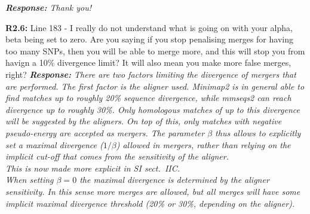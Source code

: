 \documentclass[aps,rmp,onecolumn]{revtex4-1}
\newcommand{\reviewer}[2]{\textbf{#1:} #2\vskip 5mm}
\newcommand{\response}[1]{{\it {\color{response}\textbf{Response:} #1}}\vskip 5mm}
\newcommand{\SIalgo}{II}
\begin{document}
\response{Thank you!}

\reviewer{R2.6}{Line 183 - I really do not understand what is going on with your alpha, beta being set to zero. Are you saying if you stop penalising merges for having too many SNPs, then you will be able to merge more, and this will stop you from havign a 10\% divergence limit? It will also mean you make more false merges, right?}
\response{There are two factors limiting the divergence of mergers that are performed. The first factor is the aligner used. Minimap2 is in general able to find matches up to roughly 20\% sequence divergence, while mmseqs2 can reach divergence up to roughly 30\%. Only homologous matches of up to this divergence will be suggested by the aligners.
On top of this, only matches with negative pseudo-energy are accepted as mergers.
The parameter $\beta$ thus allows to explicitly set a maximal divergence ($1/\beta$) allowed in mergers, rather than relying on the implicit cut-off that comes from the sensitivity of the aligner. \\
This is now made more explicit in SI sect.~{\SIalgo}C.\\
When setting $\beta = 0$ the maximal divergence is determined by the aligner sensitivity. In this sense more merges are allowed, but all merges will have some implicit maximal divergence threshold (20\% or 30\%, depending on the aligner).}
\end{document}
